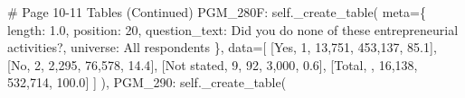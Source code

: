 \documentclass[
  11pt,
  a4paper,
]{article}
\newenvironment{Shaded}{\begin{snugshade}}{\end{snugshade}}
\newcommand{\CommentTok}[1]{\textcolor[rgb]{0.37,0.37,0.37}{#1}}
\newcommand{\NormalTok}[1]{\textcolor[rgb]{0.00,0.23,0.31}{#1}}
\newcommand{\OperatorTok}[1]{\textcolor[rgb]{0.37,0.37,0.37}{#1}}
\newcommand{\StringTok}[1]{\textcolor[rgb]{0.13,0.47,0.30}{#1}}
\newcommand{\VariableTok}[1]{\textcolor[rgb]{0.07,0.07,0.07}{#1}}
\begin{document}
\begin{Shaded}
\begin{Highlighting}[]
            \CommentTok{\# Page 10{-}11 Tables (Continued)}
            \StringTok{\textquotesingle{}PGM\_280F\textquotesingle{}}\NormalTok{: }\VariableTok{self}\NormalTok{.\_create\_table(}
\NormalTok{                meta}\OperatorTok{=}\NormalTok{\{}
                    \StringTok{\textquotesingle{}length\textquotesingle{}}\NormalTok{: }\StringTok{\textquotesingle{}1.0\textquotesingle{}}\NormalTok{, }\StringTok{\textquotesingle{}position\textquotesingle{}}\NormalTok{: }\StringTok{\textquotesingle{}20\textquotesingle{}}\NormalTok{,}
                    \StringTok{\textquotesingle{}question\_text\textquotesingle{}}\NormalTok{: }\StringTok{\textquotesingle{}Did you do none of these entrepreneurial activities?\textquotesingle{}}\NormalTok{,}
                    \StringTok{\textquotesingle{}universe\textquotesingle{}}\NormalTok{: }\StringTok{\textquotesingle{}All respondents\textquotesingle{}}
\NormalTok{                \},}
\NormalTok{                data}\OperatorTok{=}\NormalTok{[}
\NormalTok{                    [}\StringTok{\textquotesingle{}Yes\textquotesingle{}}\NormalTok{, }\StringTok{\textquotesingle{}1\textquotesingle{}}\NormalTok{, }\StringTok{\textquotesingle{}13,751\textquotesingle{}}\NormalTok{, }\StringTok{\textquotesingle{}453,137\textquotesingle{}}\NormalTok{, }\StringTok{\textquotesingle{}85.1\textquotesingle{}}\NormalTok{],}
\NormalTok{                    [}\StringTok{\textquotesingle{}No\textquotesingle{}}\NormalTok{, }\StringTok{\textquotesingle{}2\textquotesingle{}}\NormalTok{, }\StringTok{\textquotesingle{}2,295\textquotesingle{}}\NormalTok{, }\StringTok{\textquotesingle{}76,578\textquotesingle{}}\NormalTok{, }\StringTok{\textquotesingle{}14.4\textquotesingle{}}\NormalTok{],}
\NormalTok{                    [}\StringTok{\textquotesingle{}Not stated\textquotesingle{}}\NormalTok{, }\StringTok{\textquotesingle{}9\textquotesingle{}}\NormalTok{, }\StringTok{\textquotesingle{}92\textquotesingle{}}\NormalTok{, }\StringTok{\textquotesingle{}3,000\textquotesingle{}}\NormalTok{, }\StringTok{\textquotesingle{}0.6\textquotesingle{}}\NormalTok{],}
\NormalTok{                    [}\StringTok{\textquotesingle{}Total\textquotesingle{}}\NormalTok{, }\StringTok{\textquotesingle{}\textquotesingle{}}\NormalTok{, }\StringTok{\textquotesingle{}16,138\textquotesingle{}}\NormalTok{, }\StringTok{\textquotesingle{}532,714\textquotesingle{}}\NormalTok{, }\StringTok{\textquotesingle{}100.0\textquotesingle{}}\NormalTok{]}
\NormalTok{                ]}
\NormalTok{            ),}
            \StringTok{\textquotesingle{}PGM\_290\textquotesingle{}}\NormalTok{: }\VariableTok{self}\NormalTok{.\_create\_table(}

\end{Highlighting}
\end{Shaded}
\end{document}
